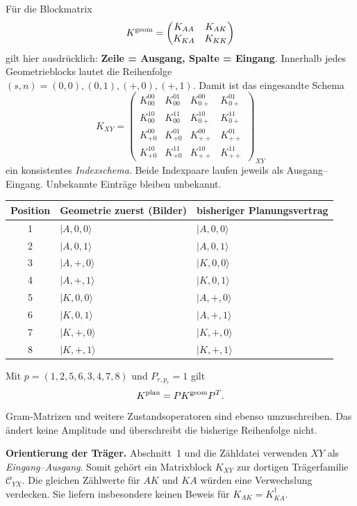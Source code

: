 \documentclass[10pt,a4paper]{article}
\begin{document}
Für die Blockmatrix
\[
K^{\rm geom}=\begin{pmatrix}K_{AA}&K_{AK}\\K_{KA}&K_{KK}\end{pmatrix}
\]
gilt hier ausdrücklich: \textbf{Zeile = Ausgang, Spalte = Eingang}.
Innerhalb jedes Geometrieblocks lautet die Reihenfolge
$(s,n)=(0,0),(0,1),(+,0),(+,1)$. Damit ist das eingesandte Schema
\[
K_{XY}=\left(\begin{array}{cccc}
K_{00}^{00}&K_{00}^{01}&K_{0+}^{00}&K_{0+}^{01}\\
K_{00}^{10}&K_{00}^{11}&K_{0+}^{10}&K_{0+}^{11}\\
K_{+0}^{00}&K_{+0}^{01}&K_{++}^{00}&K_{++}^{01}\\
K_{+0}^{10}&K_{+0}^{11}&K_{++}^{10}&K_{++}^{11}
\end{array}\right)_{XY}
\]
ein konsistentes \emph{Indexschema}. Beide Indexpaare laufen jeweils als
Ausgang--Eingang. Unbekannte Einträge bleiben unbekannt.

\begin{center}
\begin{tabular}{cll}
\toprule
Position & Geometrie zuerst (Bilder) & bisheriger Planungsvertrag\\\midrule
1 &$|A,0,0\rangle$ &$|A,0,0\rangle$\\
2 &$|A,0,1\rangle$ &$|A,0,1\rangle$\\
3 &$|A,+,0\rangle$ &$|K,0,0\rangle$\\
4 &$|A,+,1\rangle$ &$|K,0,1\rangle$\\
5 &$|K,0,0\rangle$ &$|A,+,0\rangle$\\
6 &$|K,0,1\rangle$ &$|A,+,1\rangle$\\
7 &$|K,+,0\rangle$ &$|K,+,0\rangle$\\
8 &$|K,+,1\rangle$ &$|K,+,1\rangle$\\\bottomrule
\end{tabular}
\end{center}
Mit $p=(1,2,5,6,3,4,7,8)$ und $P_{r,p_r}=1$ gilt
\[
K^{\rm plan}=P K^{\rm geom}P^T.
\]
Gram-Matrizen und weitere Zustandsoperatoren sind ebenso umzuschreiben.
Das ändert keine Amplitude und überschreibt die bisherige Reihenfolge nicht.

\textbf{Orientierung der Träger.} Abschnitt~1 und die Zähldatei verwenden
$XY$ als \emph{Eingang--Ausgang}. Somit gehört ein Matrixblock $K_{XY}$ zur
dortigen Trägerfamilie $\mathcal C_{YX}$. Die gleichen Zählwerte für $AK$
und $KA$ würden eine Verwechslung verdecken. Sie liefern insbesondere
keinen Beweis für $K_{AK}=K_{KA}^\dagger$.
\end{document}
